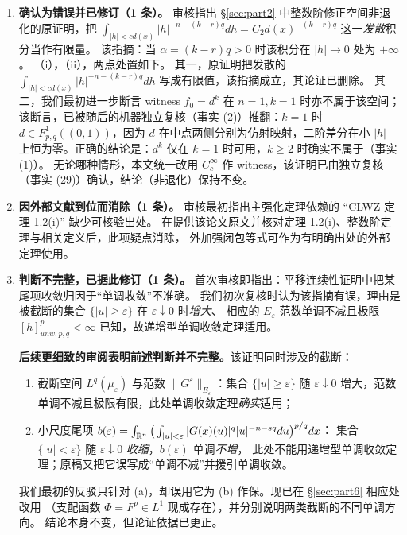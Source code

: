 \begin{enumerate}
\item \textbf{确认为错误并已修订（1 条）。}
  审核指出 \S\ref{sec:part2} 中整数阶修正空间非退化的原证明，把
  $\int_{|h|<cd(x)}|h|^{-n-(k-r)q}dh=C_2d(x)^{-(k-r)q}$ 这一\emph{发散}积分当作有限量。
  该指摘：当 $\alpha=(k-r)q>0$ 时该积分在 $|h|\to0$ 处为 $+\infty$。
  （i），（ii），两点处置如下。
  其一，原证明把发散的 $\int_{|h|<cd(x)}|h|^{-n-(k-r)q}dh$ 写成有限值，该指摘成立，其论证已删除。
  其二，我们最初进一步断言 witness $f_0=d^k$ 在 $n=1,k=1$ 时亦不属于该空间；该断言，已被随后的机器独立复核（事实 (2)）推翻：$k=1$ 时 $d\in F^{1}_{p,q}((0,1))$，因为 $d$ 在中点两侧分别为仿射映射，二阶差分在小 $|h|$ 上恒为零。正确的结论是：$d^k$ 仅在 $k=1$ 时可用，$k\ge2$ 时确实不属于（事实 (1)）。
  无论哪种情形，本文统一改用 $C_c^\infty$ 作 witness，该证明已由独立复核（事实 (29)）确认，结论（非退化）保持不变。

\item \textbf{因外部文献到位而消除（1 条）。}
  审核最初指出主强化定理依赖的 ``CLWZ 定理 1.2(i)'' 缺少可核验出处。
  在提供该论文原文并核对定理 1.2(i)、整数阶定理与相关定义后，此项疑点消除，
  外加强闭包等式可作为有明确出处的外部定理使用。

\item \textbf{判断不完整，已据此修订（1 条）。}
  首次审核即指出：平移连续性证明中把某尾项收敛归因于``单调收敛''不准确。
  我们初次复核时认为该指摘有误，理由是被截断的集合 $\{|u|\ge\varepsilon\}$ 在 $\varepsilon\downarrow0$ 时\emph{增大}、
  相应的 $E_\varepsilon$ 范数单调不减且极限 $[h]^p_{unw,p,q}<\infty$ 已知，故递增型单调收敛定理适用。

  \textbf{后续更细致的审阅表明前述判断并不完整。}该证明同时涉及的截断：
  \begin{enumerate}[label=(\alph*)]
    \item 截断空间 $L^q(\mu_\varepsilon)$ 与范数 $\|G^\varepsilon\|_{E_\varepsilon}$：集合 $\{|u|\ge\varepsilon\}$
          随 $\varepsilon\downarrow0$ 增大，范数单调不减且极限有限，此处单调收敛定理\emph{确实}适用；
    \item 小尺度尾项 $b(\varepsilon)=\int_{\mathbb{R}^n}\big(\int_{|u|<\varepsilon}|G(x)(u)|^q|u|^{-n-sq}du\big)^{p/q}dx$：
          集合 $\{|u|<\varepsilon\}$ 随 $\varepsilon\downarrow0$ \emph{收缩}，$b(\varepsilon)$ 单调\emph{不增}，
          此处不能用递增型单调收敛定理；原稿又把它误写成``单调不减''并援引单调收敛。
  \end{enumerate}
  我们最初的反驳只针对 (a)，却误用它为 (b) 作保。现已在 \S\ref{sec:part6} 相应处改用
  （支配函数 $\Phi=F^p\in L^1$ 现成存在），并分别说明两类截断的不同单调方向。
  结论本身不变，但论证依据已更正。


\end{enumerate}
